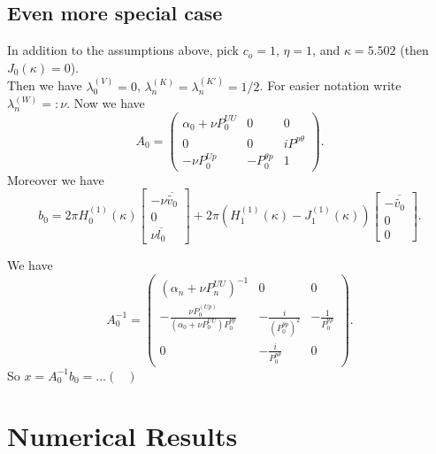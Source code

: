 \documentclass[10pt,journal,compsoc, onecolumn]{IEEEtran}
\begin{document}
\subsection{Even more special case}
In addition to the assumptions above, pick $c_o = 1$, $\eta = 1$, and $\kappa = 5.502$ (then $J_0(\kappa) = 0$).\\
Then we have $\lambda_0^{(V)} =0$, $\lambda_n^{(K)} = \lambda_n^{(K')} = 1/2$. For easier notation write $\lambda_n^{(W)} =: \nu$.
Now we have
$$
A_0 = 
\begin{pmatrix}
    \alpha_0 + \nu P^{UU}_0  & 0 & 0\\
    0 & 0  &  i P^{p \theta} \\
    -\nu P^{Up}_0  &  -P_0^{\theta p} & 1 
\end{pmatrix}.
$$
Moreover we have 
$$
b_0 = 2 \pi H_0^{(1)}(\kappa)
\begin{bmatrix}
    -\nu \overline{\tilde{v_0}} \\
    0  \\
    \nu \overline{l_0}
\end{bmatrix}
+  2 \pi (H_1^{(1)}(\kappa) - J_1^{(1)}(\kappa))
\begin{bmatrix}
    - \overline{\tilde{v_0}} \\
    0 \\
    0
\end{bmatrix}.
$$

We have 
$$
A_0^{-1} = 
\begin{pmatrix}
    (\alpha_n + \nu P^{UU}_n)^{-1} & 0 & 0 \\
    - \frac{\nu P_0^{(Up)}}{( \alpha_0 + \nu P^{UU}_0) P_0^{\theta p}} & -\frac{i}{(P_0^{\theta p})^2} & -\frac{1}{P_0^{\theta p}} \\
    0 & - \frac{i}{P^{p \theta}_0} & 0 
\end{pmatrix}.
$$
So $
x = A_0^{-1} b_0 =  ...
\begin{pmatrix}


\end{pmatrix}
$
\section{Numerical Results}

%
%
%
\end{document}

